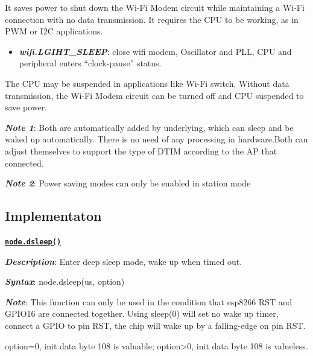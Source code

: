 \documentclass[16pt]{article}
\begin{document}
It saves power to shut down the Wi-Fi Modem circuit while maintaining a
Wi-Fi connection with no data transmission. It requires the CPU to be
working, as in PWM or I2C applications.

\begin{itemize}

\item
  \textbf{\emph{wifi.LGIHT\_SLEEP}}: close wifi modem, Oscillator and PLL, CPU and
  peripheral enters ``clock-pause'' status.
\end{itemize}

The CPU may be suspended in applications like Wi-Fi switch. Without data
transmission, the Wi-Fi Modem circuit can be turned off and CPU
suspended to save power.

\vspace{0.2cm}

\textbf{\emph{Note 1}}: Both are automatically added by underlying, which
can sleep and be waked up automatically. There is no need of any
processing in hardware.Both can adjust themselves to support the type of
DTIM according to the AP that connected.

\vspace{0.1cm}

\textbf{\emph{Note 2}}: Power saving modes can only be enabled in station
mode

\vspace{0.6cm}

\subsection{Implementaton}

\vspace{0.3cm}

{\underline{\texttt{\textbf{node.dsleep()}}}}

\vspace{0.3cm}

\textbf{\emph{Description}}: Enter deep sleep mode, wake up when timed out.

\textbf{\emph{Syntax}}: node.dsleep(us, option)

\textbf{\emph{Note}}: This function can only be used in the condition that
esp8266 RST and GPIO16 are connected together. Using sleep(0) will set
no wake up timer, connect a GPIO to pin RST, the chip will wake up by a
falling-edge on pin RST.

option=0, init data byte 108 is valuable; option\textgreater{}0, init
data byte 108 is valueless.
\end{document}
